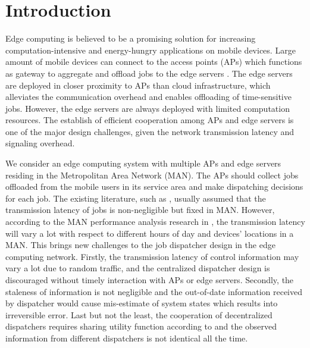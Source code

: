 
\section{Introduction}
Edge computing is believed to be a promising solution for increasing computation-intensive and energy-hungry applications on mobile devices.
Large amount of mobile devices can connect to the access points (APs) which functions as gateway to aggregate and offload jobs to the edge servers \cite{MEC-SURVEY}.
The edge servers are deployed in closer proximity to APs than cloud infrastructure, which alleviates the communication overhead and enables offloading of time-sensitive jobs.
However, the edge servers are always deployed with limited computation resources.
The establish of efficient cooperation among APs and edge servers is one of the major design challenges, given the network transmission latency and signaling overhead.

We consider an edge computing system with multiple APs and edge servers residing in the Metropolitan Area Network (MAN).
The APs should collect jobs offloaded from the mobile users in its service area and make dispatching decisions for each job.
The existing literature, such as \cite{tan-online,MOBIHOC19-ZhouZ,IOTJ18-FanQ,TOC19-LiuC,JSAC19-AlameddineHA}, usually assumed that the transmission latency of jobs is non-negligible but fixed in MAN.
However, according to the MAN performance analysis research in \cite{MAN-LATENCY}, the transmission latency will vary a lot with respect to different hours of day and devices' locations in a MAN.
This brings new challenges to the job dispatcher design in the edge computing network.
Firstly, the transmission latency of control information may vary a lot due to random traffic, and the centralized dispatcher design is discouraged without timely interaction with APs or edge servers.
Secondly, the staleness of information is not negligible and the out-of-date information received by dispatcher would cause mis-estimate of system states which results into irreversible error.
Last but not the least, the cooperation of decentralized dispatchers requires sharing utility function according to \cite{IJCAI03-NairR} and the observed information from different dispatchers is not identical all the time.


